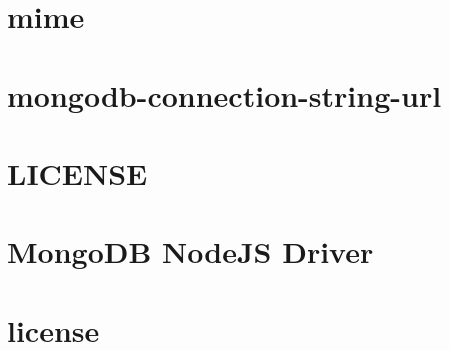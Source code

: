 \documentclass[twoside]{book}
\newcommand{\+}{\discretionary{\mbox{\scriptsize$\hookleftarrow$}}{}{}}
\begin{document}
\chapter{mime}
\label{md__c___users_vaishnavi_jadhav__desktop__developer_code_mean_stack_example_server_node_modules_mime__r_e_a_d_m_e}

\chapter{mongodb-\/connection-\/string-\/url}
\label{md__c___users_vaishnavi_jadhav__desktop__developer_code_mean_stack_example_server_node_modules_mbebe547e83358a0d7e7815acdc89a088}

\chapter{LICENSE}
\label{md__c___users_vaishnavi_jadhav__desktop__developer_code_mean_stack_example_server_node_modules_mongodb__l_i_c_e_n_s_e}

\chapter{Mongo\+DB Node\+JS Driver}
\label{md__c___users_vaishnavi_jadhav__desktop__developer_code_mean_stack_example_server_node_modules_mongodb__r_e_a_d_m_e}

\chapter{license}
\label{md__c___users_vaishnavi_jadhav__desktop__developer_code_mean_stack_example_server_node_modules_ms_license}

\end{document}
